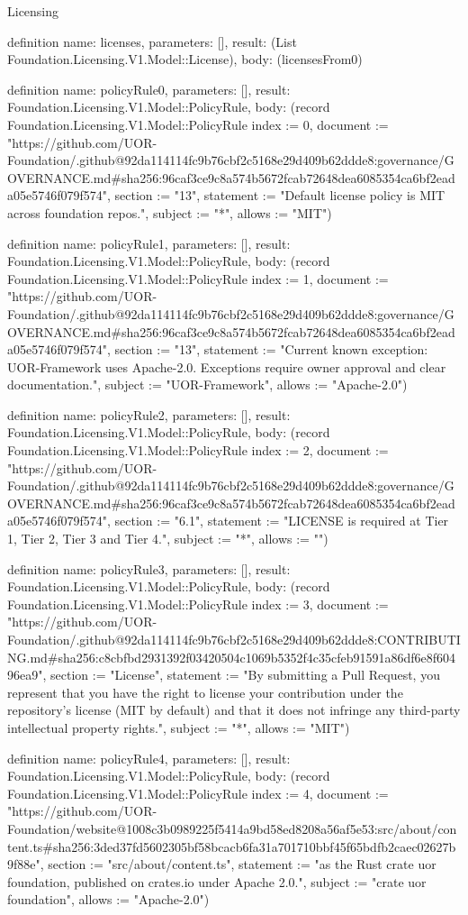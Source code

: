 \begin{lexlean}{Licensing}
\begin{semanticmodule}
definition{
  name: licenses,
  parameters: [],
  result: (List Foundation.Licensing.V1.Model::License),
  body: (licensesFrom0)
}

definition{
  name: policyRule0,
  parameters: [],
  result: Foundation.Licensing.V1.Model::PolicyRule,
  body: (record Foundation.Licensing.V1.Model::PolicyRule {index := 0, document := "https://github.com/UOR-Foundation/.github@92da114114fc9b76cbf2c5168e29d409b62ddde8:governance/GOVERNANCE.md#sha256:96caf3ce9c8a574b5672fcab72648dea6085354ca6bf2eada05e5746f079f574", section := "13", statement := "Default license policy is MIT across foundation repos.", subject := "*", allows := "MIT"})
}

definition{
  name: policyRule1,
  parameters: [],
  result: Foundation.Licensing.V1.Model::PolicyRule,
  body: (record Foundation.Licensing.V1.Model::PolicyRule {index := 1, document := "https://github.com/UOR-Foundation/.github@92da114114fc9b76cbf2c5168e29d409b62ddde8:governance/GOVERNANCE.md#sha256:96caf3ce9c8a574b5672fcab72648dea6085354ca6bf2eada05e5746f079f574", section := "13", statement := "Current known exception: UOR-Framework uses Apache-2.0. Exceptions require owner approval and clear documentation.", subject := "UOR-Framework", allows := "Apache-2.0"})
}

definition{
  name: policyRule2,
  parameters: [],
  result: Foundation.Licensing.V1.Model::PolicyRule,
  body: (record Foundation.Licensing.V1.Model::PolicyRule {index := 2, document := "https://github.com/UOR-Foundation/.github@92da114114fc9b76cbf2c5168e29d409b62ddde8:governance/GOVERNANCE.md#sha256:96caf3ce9c8a574b5672fcab72648dea6085354ca6bf2eada05e5746f079f574", section := "6.1", statement := "LICENSE is required at Tier 1, Tier 2, Tier 3 and Tier 4.", subject := "*", allows := ""})
}

definition{
  name: policyRule3,
  parameters: [],
  result: Foundation.Licensing.V1.Model::PolicyRule,
  body: (record Foundation.Licensing.V1.Model::PolicyRule {index := 3, document := "https://github.com/UOR-Foundation/.github@92da114114fc9b76cbf2c5168e29d409b62ddde8:CONTRIBUTING.md#sha256:c8cbfbd2931392f03420504c1069b5352f4c35cfeb91591a86df6e8f60496ea9", section := "License", statement := "By submitting a Pull Request, you represent that you have the right to license your contribution under the repository's license (MIT by default) and that it does not infringe any third-party intellectual property rights.", subject := "*", allows := "MIT"})
}

definition{
  name: policyRule4,
  parameters: [],
  result: Foundation.Licensing.V1.Model::PolicyRule,
  body: (record Foundation.Licensing.V1.Model::PolicyRule {index := 4, document := "https://github.com/UOR-Foundation/website@1008c3b0989225f5414a9bd58ed8208a56af5e53:src/about/content.ts#sha256:3ded37fd5602305bf58bcacb6fa31a701710bbf45f65bdfb2caec02627b9f88e", section := "src/about/content.ts", statement := "as the Rust crate uor foundation, published on crates.io under Apache 2.0.", subject := "crate uor foundation", allows := "Apache-2.0"})
}


\end{semanticmodule}
\end{lexlean}

